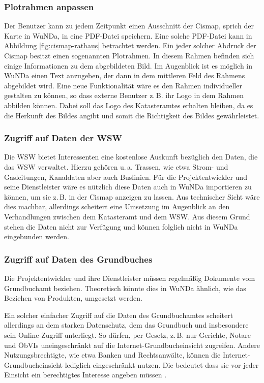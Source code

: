 \subsubsection{Plotrahmen anpassen}
Der Benutzer kann zu jedem Zeitpunkt einen Ausschnitt der Cismap, sprich der Karte in \ac{WuNDa}, in eine PDF-Datei speichern.
Eine solche PDF-Datei kann in Abbildung \vref{fig:cismap-rathaus} betrachtet werden.
Ein jeder solcher Abdruck der Cismap besitzt einen sogenannten Plotrahmen. In diesem Rahmen befinden sich einige Informationen zu dem abgebildeten Bild.
Im Augenblick ist es möglich in \ac{WuNDa} einen Text anzugeben, der dann in dem mittleren Feld des Rahmens abgebildet wird.
Eine neue Funktionalität wäre es den Rahmen individueller gestalten zu können, so dass externe Benutzer z.\,B. ihr Logo in dem Rahmen abbilden können.
Dabei soll das Logo des Katasteramtes erhalten bleiben, da es die Herkunft des Bildes angibt und somit die Richtigkeit des Bildes gewährleistet. 

\subsubsection{Zugriff auf Daten der WSW}
Die \ac{WSW} bietet Interessenten eine kostenlose Auskunft bezüglich den Daten, die das \ac{WSW} verwaltet.
Hierzu gehören u.\,a. Trassen, wie etwa Strom- und Gasleitungen, Kanaldaten aber auch Buslinien.
Für die Projektentwickler und seine Dienstleister wäre es nützlich diese Daten auch in \ac{WuNDa} importieren zu können, um sie z.\,B. in der Cismap anzeigen zu lassen.
Aus technischer Sicht wäre dies machbar, allerdings scheitert eine Umsetzung  im Augenblick an den Verhandlungen zwischen dem Katasteramt und dem \ac{WSW}.
Aus diesem Grund stehen die Daten nicht zur Verfügung und können folglich nicht in \ac{WuNDa} eingebunden werden.
\subsubsection{Zugriff auf Daten des Grundbuches}
Die Projektentwickler und ihre Dienstleister müssen regelmäßig Dokumente vom Grundbuchamt beziehen.
Theoretisch könnte dies in \ac{WuNDa} ähnlich, wie das Beziehen von Produkten, umgesetzt werden.

Ein solcher einfacher Zugriff auf die Daten des Grundbuchamtes scheitert allerdings an dem starken Datenschutz, dem das Grundbuch und insbesondere sein Online-Zugriff unterliegt.
So dürfen, per Gesetz, z.\,B. nur Gerichte, Notare und \acp{ÖbVI} uneingeschränkt auf die Internet-Grundbucheinsicht zugreifen.
Andere Nutzungsbrechtigte, wie etwa Banken und Rechtsanwälte, können die Internet-Grundbucheinsicht lediglich eingeschränkt nutzen.
Die bedeutet dass sie vor jeder Einsicht ein berechtigtes Interesse angeben müssen \autocite[vgl.][]{justiz-grundbucheinsicht}.

